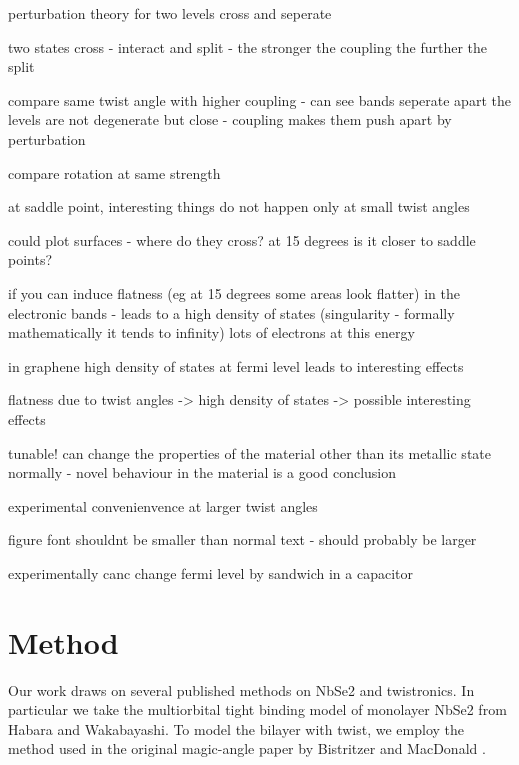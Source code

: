 \documentclass[12pt]{report} %
\begin{document}
  perturbation theory for two levels cross and seperate

  two states cross - interact and split - the stronger the coupling the further the split

 compare same twist angle with higher coupling - can see  bands seperate apart the levels are not degenerate but close - coupling makes them push apart by perturbation

 compare rotation at same strength 

 at saddle point, interesting things do not happen only at small twist angles

  could plot surfaces - where do they cross? at 15 degrees is it closer to saddle points?

if you can induce flatness (eg at 15 degrees some areas look flatter) in the electronic bands - leads to a high density of states (singularity - formally mathematically it tends to infinity) lots of electrons at this energy

in graphene high density of states at fermi level leads to interesting effects

flatness due to twist angles -> high density of states -> possible interesting effects

tunable! can change the properties of the material other than its metallic state normally - novel behaviour in the material is a good conclusion

 experimental convenienvence at larger twist angles

figure font shouldnt be smaller than normal text - should probably be larger

experimentally canc change fermi level by sandwich in a capacitor



\section*{Method}
  Our work draws on several published methods on NbSe2 and twistronics. In particular we take the multiorbital tight binding model of monolayer NbSe2 from Habara and Wakabayashi\cite{Habara2021}. To model the bilayer with twist, we employ the method used in the original magic-angle paper by Bistritzer and MacDonald \cite{Bistritzer2011}. 
\end{document}
